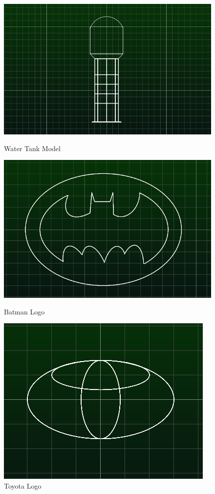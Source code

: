 \begin{figure}
\begin{center}
\includegraphics[scale=0.5]{images/lualogo/w2.png}
\caption{Water Tank Model}
\includegraphics[scale=0.5]{images/lualogo/batman.png} 
\caption{Batman Logo}
\includegraphics[scale=0.4]{images/lualogo/toyota.png}
\caption{Toyota Logo}
\end{center}
\end{figure}
